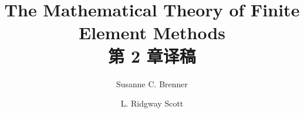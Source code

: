 \documentclass[a4paper,UTF8,12pt]{ctexart}
\title{The Mathematical Theory of Finite Element Methods\\第 2 章译稿}
\author{Susanne C. Brenner \and L. Ridgway Scott}
\date{}
\begin{document}
\maketitle
\setcounter{section}{1}
\renewcommand{\thethmcount}{\thesubsection.\arabic{thmcount}}
\renewcommand{\theequation}{\thesubsection.\arabic{equation}}
\renewcommand{\thefigure}{\thesection.\arabic{figure}}
\renewcommand{\thetable}{\thesection.\arabic{table}}

\end{document}
